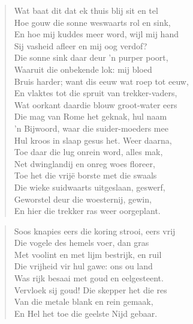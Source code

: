 \begin{verse}
Wat baat dit dat ek thuis blij sit en tel \\ 
Hoe gouw die sonne weswaarts rol en sink, \\ 
En hoe mij kuddes meer word, wijl mij hand \\ 
Sij vasheid afleer en mij oog verdof? \\ 
Die sonne sink daar deur ’n purper poort, \\ 
Waaruit die onbekende lok: mij bloed \\ 
Bruis harder; want dis eeuw wat roep tot eeuw, \\ 
En vlaktes tot die spruit van trekker-vaders, \\ 
Wat oorkant daardie blouw groot-water eers \\ 
Die mag van Rome het geknak, hul naam \\ 
’n Bijwoord, waar die suider-moeders mee \\ 
Hul kroos in slaap gesus het. Weer daarna, \\ 
Toe daar die lug onrein word, alles mak, \\ 
Net dwinglandij en onreg woes floreer, \\ 
Toe het die vrij\"e borste met die swaals \\ 
Die wieke suidwaarts uitgeslaan, geswerf, \\ 
Geworstel deur die woesternij, gewin, \\ 
En hier die trekker ras weer oorgeplant. \\ 
\end{verse}

\begin{verse}
Soos knapies eers die koring strooi, eers vrij \\ 
Die vogele des hemels voer, dan gras \\ 
Met voolint en met lijm bestrijk, en ruil \\ 
Die vrijheid vir hul gawe: ons ou land \\ 
Was rijk besaai met goud en eelgesteent. \\ 
Vervloek sij goud! Die skepper het die res \\ 
Van die metale blank en rein gemaak, \\ 
En Hel het toe die geelste Nijd gebaar. \\ 
\end{verse}

